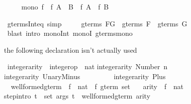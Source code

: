 \begin{isabellebody}
\begin{isamarkuptext}
\begin{isabelle}%
\ \ \ \ \ mono\ f\ {\isasymLongrightarrow}\ f\ {\isacharparenleft}A\ {\isasyminter}\ B{\isacharparenright}\ {\isasymsubseteq}\ f\ A\ {\isasyminter}\ f\ B%
\end{isabelle}
%
\end{isamarkuptext}%
\isamarkuptrue%
\isamarkupfalse%
\ gterms{\isacharunderscore}Int{\isacharunderscore}eq\ {\isacharbrackleft}simp{\isacharbrackright}{\isacharcolon}\isanewline
\ \ \ \ \ {\isachardoublequoteopen}gterms\ {\isacharparenleft}F{\isasyminter}G{\isacharparenright}\ {\isacharequal}\ gterms\ F\ {\isasyminter}\ gterms\ G{\isachardoublequoteclose}\isanewline
%
\isadelimproof
%
\endisadelimproof
%
\isatagproof
{}\isamarkupfalse%
\ {\isacharparenleft}blast\ intro{\isacharbang}{\isacharcolon}\ mono{\isacharunderscore}Int\ monoI\ gterms{\isacharunderscore}mono{\isacharparenright}%
\endisatagproof
{\isafoldproof}%
%
\isadelimproof
%
\endisadelimproof
%
\begin{isamarkuptext}%
the following declaration isn't actually used%
\end{isamarkuptext}%
\isamarkuptrue%
\isamarkupfalse%
\ integer{\isacharunderscore}arity\ {\isacharcolon}{\isacharcolon}\ {\isachardoublequoteopen}integer{\isacharunderscore}op\ {\isasymRightarrow}\ nat{\isachardoublequoteclose}\isanewline
{}\isamarkupfalse%
\isanewline
{\isachardoublequoteopen}integer{\isacharunderscore}arity\ {\isacharparenleft}Number\ n{\isacharparenright}\ \ \ \ \ \ \ \ {\isacharequal}\ {}{\isachardoublequoteclose}\isanewline
{\isachardoublequoteopen}integer{\isacharunderscore}arity\ UnaryMinus\ \ \ \ \ \ \ \ {\isacharequal}\ {}{\isachardoublequoteclose}\isanewline
{\isachardoublequoteopen}integer{\isacharunderscore}arity\ Plus\ \ \ \ \ \ \ \ \ \ \ \ \ \ {\isacharequal}\ {}{\isachardoublequoteclose}\isanewline
\isanewline
{}\isamarkupfalse%
\isanewline
\ \ well{\isacharunderscore}formed{\isacharunderscore}gterm\ {\isacharcolon}{\isacharcolon}\ {\isachardoublequoteopen}{\isacharparenleft}{\isacharprime}f\ {\isasymRightarrow}\ nat{\isacharparenright}\ {\isasymRightarrow}\ {\isacharprime}f\ gterm\ set{\isachardoublequoteclose}\isanewline
\ \ \ arity\ {\isacharcolon}{\isacharcolon}\ {\isachardoublequoteopen}{\isacharprime}f\ {\isasymRightarrow}\ nat{\isachardoublequoteclose}\isanewline
{}\isanewline
step{\isacharbrackleft}intro{\isacharbang}{\isacharbrackright}{\isacharcolon}\ {\isachardoublequoteopen}{\isasymlbrakk}{\isasymforall}t\ {\isasymin}\ set\ args{\isachardot}\ t\ {\isasymin}\ well{\isacharunderscore}formed{\isacharunderscore}gterm\ arity{\isacharsemicolon}\ \ \isanewline

\end{isabellebody}
